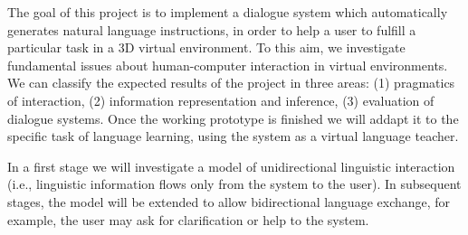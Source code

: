 

The goal of this project is to implement a dialogue system which automatically
generates natural language instructions, in order to help a user to fulfill a
particular task in a 3D virtual environment. To this aim, we investigate
fundamental issues about human-computer interaction in virtual environments. We
can classify the expected results of the project in three areas: (1) pragmatics
of interaction, (2) information representation and inference, (3) evaluation of
dialogue systems. Once the working prototype is finished we will addapt it to
the specific task of language learning, using the system as a virtual language
teacher. 


In a first stage we will investigate a model of unidirectional linguistic
interaction (i.e., linguistic information flows only from the system to the
user). In subsequent stages, the model will be extended to allow bidirectional
language exchange, for example, the user may ask for clarification or help to
the system.

